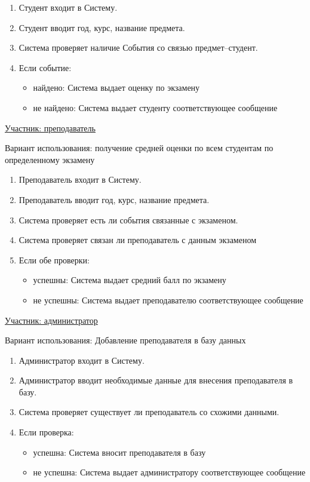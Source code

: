 \documentclass[utf8x, 12pt]{G7-32}
\begin{document}
\begin{enumerate}
	\item Студент входит в Систему.
	\item Студент вводит год, курс, название предмета.
	\item Система проверяет наличие События со связью предмет--студент.
	\item Если событие:
	\begin{itemize}
		\item найдено: Система выдает оценку по экзамену
		\item не найдено: Система выдает студенту соответствующее сообщение
	\end{itemize}
	
\end{enumerate}


\bigskip


\underline{Участник: преподаватель}

Вариант использования: получение средней оценки по всем студентам по определенному экзамену

\begin{enumerate}
	\item Преподаватель входит в Систему.
	\item Преподаватель вводит год, курс, название предмета.
	\item Система проверяет есть ли события связанные с экзаменом.
	\item Система проверяет связан ли преподаватель с данным экзаменом
	\item Если обе проверки:
	\begin{itemize}
		\item успешны: Система выдает средний балл по экзамену
		\item не успешны: Система выдает преподавателю соответствующее сообщение
	\end{itemize}
	
\end{enumerate}


\newpage

\underline{Участник: администратор}

Вариант использования: Добавление преподавателя в базу данных

\begin{enumerate}
	\item Администратор входит в Систему.
	\item Администратор вводит необходимые данные для внесения преподавателя в базу.
	\item Система проверяет существует ли преподаватель со схожими данными.
	\item Если проверка:
	\begin{itemize}
		\item успешна: Система вносит преподавателя в базу
		\item не успешна: Система выдает администратору соответствующее сообщение
	\end{itemize}	
\end{enumerate}
\end{document}
